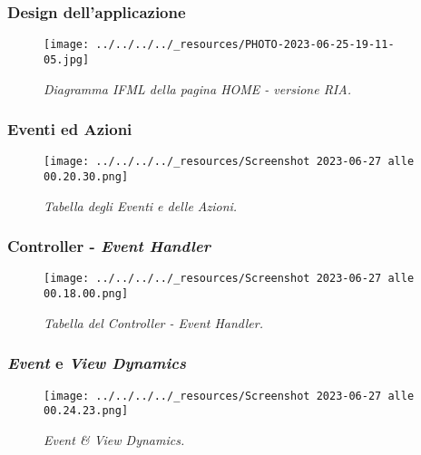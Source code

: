 \pagebreak

\hypertarget{design-dellapplicazione-1}{%
\subsubsection{Design
dell'applicazione}\label{design-dellapplicazione-1}}

\begin{figure}
\centering
\texttt{[image: ../../../../\_resources/PHOTO-2023-06-25-19-11-05.jpg]}
\caption{\emph{Diagramma IFML della pagina HOME - versione RIA.}}
\end{figure}

\pagebreak

\hypertarget{eventi-ed-azioni}{%
\subsubsection{Eventi ed Azioni}\label{eventi-ed-azioni}}

\begin{figure}
\centering
\texttt{[image: ../../../../\_resources/Screenshot 2023-06-27 alle 00.20.30.png]}
\caption{\emph{Tabella degli Eventi e delle Azioni.}}
\end{figure}

\pagebreak

\hypertarget{controller---event-handler}{%
\subsubsection{\texorpdfstring{Controller - \emph{Event
Handler}}{Controller - Event Handler}}\label{controller---event-handler}}

\begin{figure}
\centering
\texttt{[image: ../../../../\_resources/Screenshot 2023-06-27 alle 00.18.00.png]}
\caption{\emph{Tabella del Controller - Event Handler.}}
\end{figure}

\pagebreak

\hypertarget{event-e-view-dynamics}{%
\subsubsection{\texorpdfstring{\emph{Event} e \emph{View
Dynamics}}{Event e View Dynamics}}\label{event-e-view-dynamics}}

\begin{figure}
\centering
\texttt{[image: ../../../../\_resources/Screenshot 2023-06-27 alle 00.24.23.png]}
\caption{\emph{Event \& View Dynamics.}}
\end{figure}

